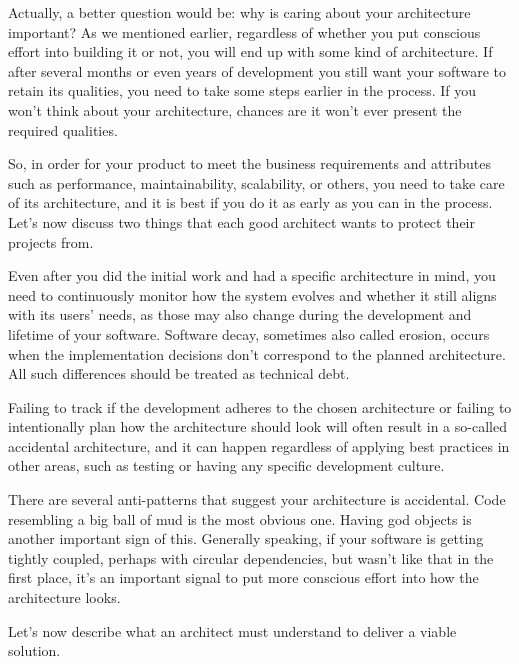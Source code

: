
Actually, a better question would be: why is caring about your architecture important? As we mentioned earlier, regardless of whether you put conscious effort into building it or not, you will end up with some kind of architecture. If after several months or even years of development you still want your software to retain its qualities, you need to take some steps earlier in the process. If you won't think about your architecture, chances are it won't ever present the required qualities.

So, in order for your product to meet the business requirements and attributes such as performance, maintainability, scalability, or others, you need to take care of its architecture, and it is best if you do it as early as you can in the process. Let's now discuss two things that each good architect wants to protect their projects from.



Even after you did the initial work and had a specific architecture in mind, you need to continuously monitor how the system evolves and whether it still aligns with its users' needs, as those may also change during the development and lifetime of your software. Software decay, sometimes also called erosion, occurs when the implementation decisions don't correspond to the planned architecture. All such differences should be treated as technical debt.



Failing to track if the development adheres to the chosen architecture or failing to intentionally plan how the architecture should look will often result in a so-called accidental architecture, and it can happen regardless of applying best practices in other areas, such as testing or having any specific development culture. 

There are several anti-patterns that suggest your architecture is accidental. Code resembling a big ball of mud is the most obvious one. Having god objects is another important sign of this. Generally speaking, if your software is getting tightly coupled, perhaps with circular dependencies, but wasn't like that in the first place, it's an important signal to put more conscious effort into how the architecture looks.

Let's now describe what an architect must understand to deliver a viable solution.










